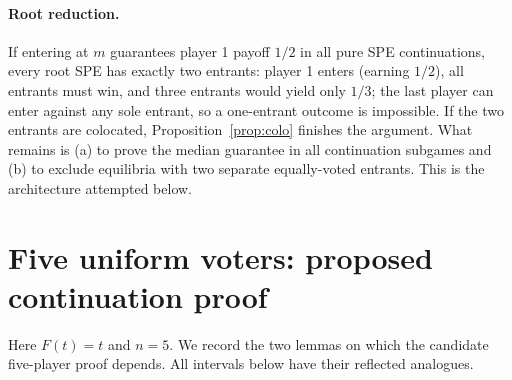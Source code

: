 \documentclass[10pt]{article}
\begin{document}
\paragraph{Root reduction.}
If entering at $m$ guarantees player 1 payoff $1/2$ in all pure SPE continuations, every root SPE has exactly two entrants: player 1 enters (earning $1/2$), all entrants must win, and three entrants would yield only $1/3$; the last player can enter against any sole entrant, so a one-entrant outcome is impossible. If the two entrants are colocated, Proposition~\ref{prop:colo} finishes the argument. What remains is (a) to prove the median guarantee in all continuation subgames and (b) to exclude equilibria with two separate equally-voted entrants. This is the architecture attempted below.

\section{Five uniform voters: proposed continuation proof}\label{sec:five}
Here $F(t)=t$ and $n=5$. We record the two lemmas on which the candidate five-player proof depends. All intervals below have their reflected analogues.
\end{document}
